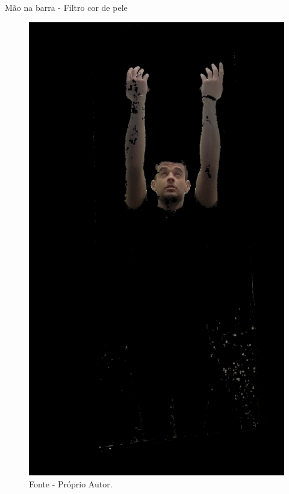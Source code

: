 \begin{frame}{Mão na barra - Filtro cor de pele}
    \begin{figure}[!ht]
    \centering
    \includegraphics[scale=0.1]{img/desenvolvimento/maoBarra/skin.png}
    \caption*{Fonte - Próprio Autor.}
    \end{figure}
\end{frame}


